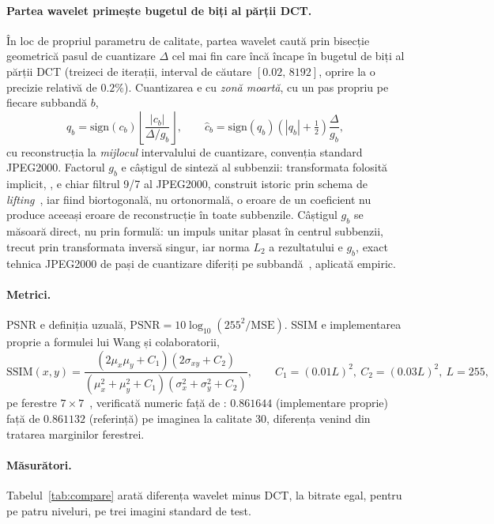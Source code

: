 \paragraph{Partea wavelet primește bugetul de biți al părții DCT.} În loc de
propriul parametru de calitate, partea wavelet caută prin bisecție
geometrică pasul de cuantizare $\Delta$ cel mai fin care încă încape în
bugetul de biți al părții DCT (treizeci de iterații, interval de căutare
$[0.02,\,8192]$, oprire la o precizie relativă de $0.2\%$). Cuantizarea e cu
\emph{zonă moartă}, cu un pas propriu pe fiecare subbandă $b$,
\[
q_b = \mathrm{sign}(c_b)\left\lfloor \frac{|c_b|}{\Delta / g_b}\right\rfloor, \qquad
\hat c_b = \mathrm{sign}(q_b)\left(|q_b|+\tfrac12\right)\frac{\Delta}{g_b},
\]
cu reconstrucția la \emph{mijlocul} intervalului de cuantizare, convenția
standard JPEG2000. Factorul $g_b$ e câștigul de sinteză al subbenzii:
transformata folosită implicit, , e chiar filtrul 9/7 al
JPEG2000, construit istoric prin schema de \emph{lifting}~\cite{sweldens1998},
iar fiind biortogonală, nu ortonormală, o eroare de un coeficient nu produce
aceeași eroare de reconstrucție în toate subbenzile. Câștigul $g_b$ se
măsoară direct, nu prin formulă: un impuls unitar plasat în centrul
subbenzii, trecut prin transformata inversă singur, iar norma $L_2$ a
rezultatului e $g_b$, exact tehnica JPEG2000 de pași de cuantizare diferiți
pe subbandă~\cite{taubmanmarcellin2002}, aplicată empiric.

\paragraph{Metrici.} PSNR e definiția uzuală,
$\mathrm{PSNR} = 10\log_{10}(255^2/\mathrm{MSE})$. SSIM e implementarea
proprie a formulei lui Wang și colaboratorii,
\[
\mathrm{SSIM}(x,y) = \frac{(2\mu_x\mu_y+C_1)(2\sigma_{xy}+C_2)}{(\mu_x^2+\mu_y^2+C_1)(\sigma_x^2+\sigma_y^2+C_2)}, \qquad
C_1=(0.01L)^2,\ C_2=(0.03L)^2,\ L=255,
\]
pe ferestre $7\times 7$~\cite{wangbovik2004}, verificată numeric față de
: $0.861644$ (implementare
proprie) față de $0.861132$ (referință) pe imaginea  la
calitate 30, diferența venind din tratarea marginilor ferestrei.

\paragraph{Măsurători.} Tabelul~\ref{tab:compare} arată diferența wavelet
minus DCT, la bitrate egal, pentru  pe patru niveluri, pe trei
imagini standard de test.

